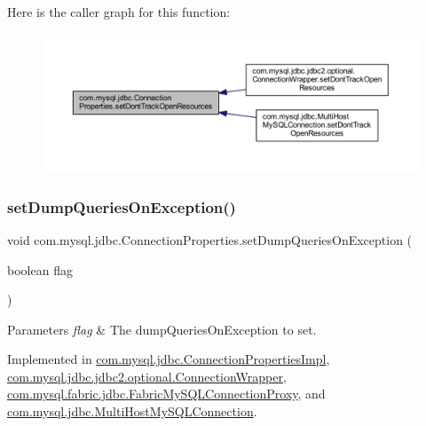 Here is the caller graph for this function\+:\nopagebreak
\begin{figure}[H]
\begin{center}
\leavevmode
\includegraphics[width=350pt]{interfacecom_1_1mysql_1_1jdbc_1_1_connection_properties_a71698dd42306aa0d570cda6344bc8680_icgraph}
\end{center}
\end{figure}
\mbox{\label{interfacecom_1_1mysql_1_1jdbc_1_1_connection_properties_a4bdf459325c8a9a96459959ea493f6a3}} 
\subsubsection{\texorpdfstring{set\+Dump\+Queries\+On\+Exception()}{setDumpQueriesOnException()}}
{\footnotesize\ttfamily void com.\+mysql.\+jdbc.\+Connection\+Properties.\+set\+Dump\+Queries\+On\+Exception (\begin{DoxyParamCaption}\item[{boolean}]{flag }\end{DoxyParamCaption})}


\begin{DoxyParams}{Parameters}
{\em flag} & The dump\+Queries\+On\+Exception to set. \\
\hline
\end{DoxyParams}


Implemented in \mbox{\hyperlink{classcom_1_1mysql_1_1jdbc_1_1_connection_properties_impl_a10091184059369f2348483fbcaf07d32}{com.\+mysql.\+jdbc.\+Connection\+Properties\+Impl}}, \mbox{\hyperlink{classcom_1_1mysql_1_1jdbc_1_1jdbc2_1_1optional_1_1_connection_wrapper_a0e4c6f477c15bd82e03a4376fbef7124}{com.\+mysql.\+jdbc.\+jdbc2.\+optional.\+Connection\+Wrapper}}, \mbox{\hyperlink{classcom_1_1mysql_1_1fabric_1_1jdbc_1_1_fabric_my_s_q_l_connection_proxy_a11c4e8214a809bc8362d32ce223fc15b}{com.\+mysql.\+fabric.\+jdbc.\+Fabric\+My\+S\+Q\+L\+Connection\+Proxy}}, and \mbox{\hyperlink{classcom_1_1mysql_1_1jdbc_1_1_multi_host_my_s_q_l_connection_ad62d20e58b21ef53f69e1c7c39325ef8}{com.\+mysql.\+jdbc.\+Multi\+Host\+My\+S\+Q\+L\+Connection}}.

